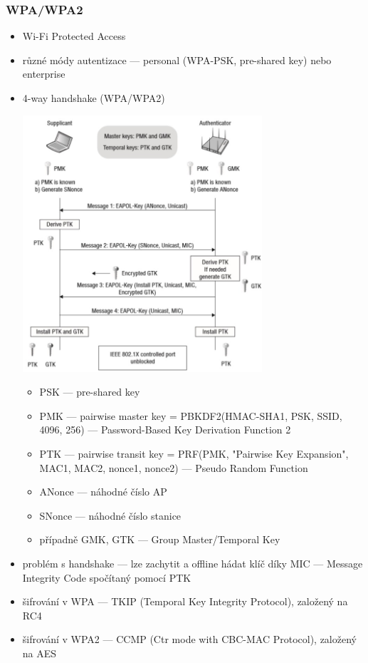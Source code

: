 \subsubsection*{WPA/WPA2}
\begin{itemize}
	\item Wi-Fi Protected Access
	\item různé módy autentizace --- personal (WPA-PSK, pre-shared key) nebo enterprise
	\item 4-way handshake (WPA/WPA2)
	
	\includegraphics[width=0.7\textwidth]{img/OB-13_3.jpg}
	
	\begin{itemize}
		\item PSK --- pre-shared key
		\item PMK --- pairwise master key = PBKDF2(HMAC-SHA1, PSK, SSID, 4096, 256) --- Password-Based Key Derivation Function 2
		\item PTK --- pairwise transit key = PRF(PMK, "Pairwise Key Expansion", MAC1, MAC2, nonce1, nonce2) --- Pseudo Random Function
		\item ANonce --- náhodné číslo AP
		\item SNonce --- náhodné číslo stanice
		\item případně GMK, GTK ---  Group Master/Temporal Key
	\end{itemize}
	\item problém s handshake --- lze zachytit a offline hádat klíč díky MIC --- Message Integrity Code spočítaný pomocí PTK
	\item šifrování v WPA --- TKIP (Temporal Key Integrity Protocol), založený na RC4
	\item šifrování v WPA2 --- CCMP (Ctr mode with CBC-MAC Protocol), založený na AES
\end{itemize}

